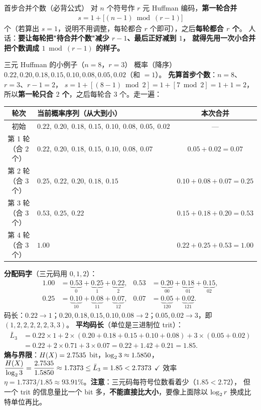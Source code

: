 \begin{defbox}{首步合并个数（必背公式）}
对 $n$ 个符号作 $r$ 元 Huffman 编码，\textbf{第一轮合并}
\begin{align*}
s=1+\big[(n-1)\bmod(r-1)\big]
\end{align*}
个（若算出 $s=1$，说明不用调整，每轮都合 $r$ 个即可），之后\textbf{每轮都合 $r$ 个}。
人话：\textbf{要让每轮把"待合并个数"减少 $r-1$、最后正好减到 $1$，
就得先用一次小合并把个数调成 $1\bmod(r-1)$ 的样子。}
\end{defbox}

\begin{calc}{三元 Huffman 的小例子（$n=8$，$r=3$）}
概率（降序）$0.22,0.20,0.18,0.15,0.10,0.08,0.05,0.02$（和 $=1$）。
\textbf{先算首步个数}：$n=8$、$r=3$、$r-1=2$，
$s=1+[(8-1)\bmod2]=1+[7\bmod2]=1+1=2$，
所以\textbf{第一轮只合 $2$ 个}，之后每轮合 $3$ 个。走一遍：

\begin{center}
\small
\begin{tabular}{@{}clc@{}}
\toprule
轮次 & 当前概率序列（从大到小） & 本次合并\\
\midrule
初始 & $0.22,\ 0.20,\ 0.18,\ 0.15,\ 0.10,\ 0.08,\ 0.05,\ 0.02$ & ---\\
第 1 轮（合 $2$ 个） & $0.22,\ 0.20,\ 0.18,\ 0.15,\ 0.10,\ 0.08,\ \mathbf{0.07}$ & $0.05+0.02=0.07$\\
第 2 轮（合 $3$ 个） & $0.25,\ 0.22,\ 0.20,\ 0.18,\ \mathbf{0.15}$ & $0.10+0.08+0.07=0.25$\\
第 3 轮（合 $3$ 个） & $0.53,\ 0.25,\ \mathbf{0.22}$ & $0.15+0.18+0.20=0.53$\\
第 4 轮（合 $3$ 个） & $\mathbf{1.00}$ & $0.22+0.25+0.53=1.00$\\
\bottomrule
\end{tabular}
\end{center}

\textbf{分配码字}（三元码用 $0,1,2$）：
\begin{align*}
1.00&=\underbrace{0.53}_{0}+\underbrace{0.25}_{1}+\underbrace{0.22}_{2}, &
0.53&=\underbrace{0.20}_{00}+\underbrace{0.18}_{01}+\underbrace{0.15}_{02},\\
0.25&=\underbrace{0.10}_{10}+\underbrace{0.08}_{11}+\underbrace{0.07}_{12}, &
0.07&=\underbrace{0.05}_{120}+\underbrace{0.02}_{121}.
\end{align*}
码长：$0.22\to1$；$0.20,0.18,0.15,0.10,0.08\to2$；$0.05,0.02\to3$，即 $(1,2,2,2,2,2,3,3)$。
\textbf{平均码长}（单位是三进制位 trit）：
\begin{align*}
\bar L_3&=0.22\times1+2\times(0.20+0.18+0.15+0.10+0.08)+3\times(0.05+0.02)\\
&=0.22+2\times0.71+3\times0.07=0.22+1.42+0.21=1.85 .
\end{align*}
\textbf{熵与界限}：$H\!\left(X\right)=2.7535$ bit，$\log_{2}3\approx1.5850$，
$\dfrac{H\!\left(X\right)}{\log_{2}3}=\dfrac{2.7535}{1.5850}\approx1.7373\le\bar L_3=1.85<2.7373$ $\checkmark$
效率 $\eta=1.7373/1.85\approx93.91\%$。\textbf{注意}：三元码每符号位数看着少（$1.85<2.72$），
但一个 trit 的信息量比一个 bit 多，\textbf{不能直接比大小}，要像上面除以 $\log_{2} r$ 换成比特单位再比。
\end{calc}

